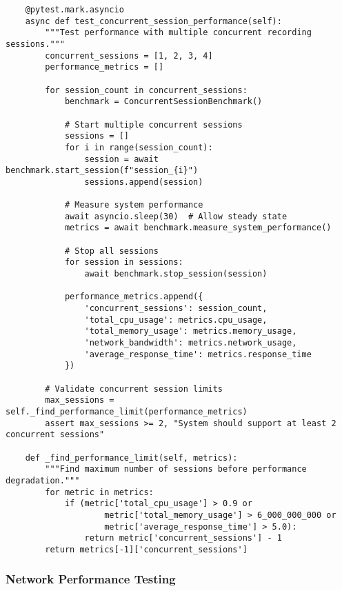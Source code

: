 \documentclass[12pt,a4paper]{report}
\begin{document}
\begin{verbatim}
    @pytest.mark.asyncio
    async def test_concurrent_session_performance(self):
        """Test performance with multiple concurrent recording sessions."""
        concurrent_sessions = [1, 2, 3, 4]
        performance_metrics = []

        for session_count in concurrent_sessions:
            benchmark = ConcurrentSessionBenchmark()

            # Start multiple concurrent sessions
            sessions = []
            for i in range(session_count):
                session = await benchmark.start_session(f"session_{i}")
                sessions.append(session)

            # Measure system performance
            await asyncio.sleep(30)  # Allow steady state
            metrics = await benchmark.measure_system_performance()

            # Stop all sessions
            for session in sessions:
                await benchmark.stop_session(session)

            performance_metrics.append({
                'concurrent_sessions': session_count,
                'total_cpu_usage': metrics.cpu_usage,
                'total_memory_usage': metrics.memory_usage,
                'network_bandwidth': metrics.network_usage,
                'average_response_time': metrics.response_time
            })

        # Validate concurrent session limits
        max_sessions = self._find_performance_limit(performance_metrics)
        assert max_sessions >= 2, "System should support at least 2 concurrent sessions"

    def _find_performance_limit(self, metrics):
        """Find maximum number of sessions before performance degradation."""
        for metric in metrics:
            if (metric['total_cpu_usage'] > 0.9 or
                    metric['total_memory_usage'] > 6_000_000_000 or
                    metric['average_response_time'] > 5.0):
                return metric['concurrent_sessions'] - 1
        return metrics[-1]['concurrent_sessions']
\end{verbatim}

\subsubsection{Network Performance Testing}
\end{document}

